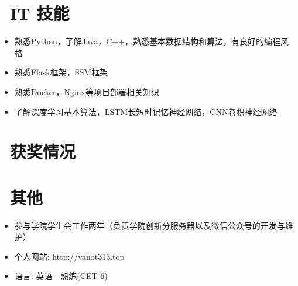 \documentclass{resume}
\begin{document}

\section{\faCogs\ IT 技能}
\begin{itemize}[parsep=0.5ex]
  \item 熟悉Python，了解Java，C++，熟悉基本数据结构和算法，有良好的编程风格
  \item 熟悉Flask框架，SSM框架
  \item 熟悉Docker，Nginx等项目部署相关知识
  \item 了解深度学习基本算法，LSTM长短时记忆神经网络，CNN卷积神经网络 
\end{itemize}

\section{\faHeartO\ 获奖情况}

\section{\faInfo\ 其他}
\begin{itemize}[parsep=0.5ex]
  \item 参与学院学生会工作两年（负责学院创新分服务器以及微信公众号的开发与维护）
  \item 个人网站: http://vanot313.top
  \item 语言: 英语 - 熟练(CET 6)
\end{itemize}

%
%
\end{document}
